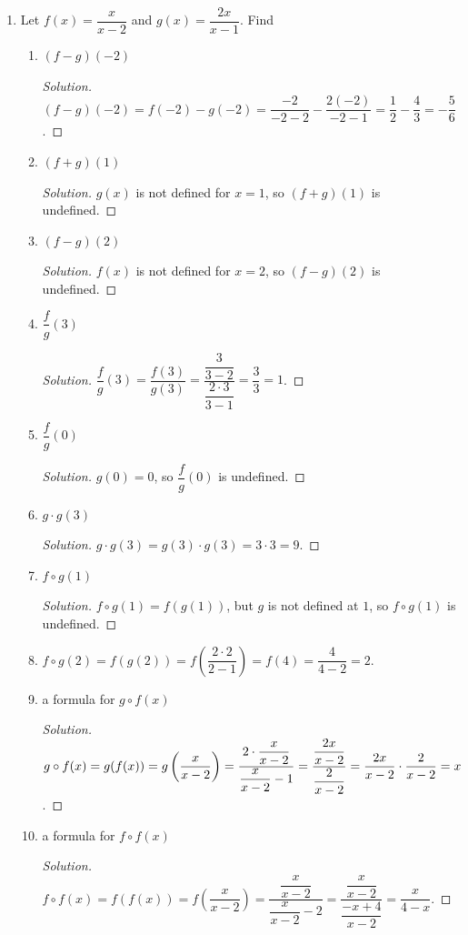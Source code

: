 \documentclass[12pt]{article}
\newenvironment{solution}{\begin{proof}[Solution]}{\end{proof}}
\begin{document}
	\begin{enumerate}
		\item Let $f(x)=\dfrac{x}{x-2}$ and $g(x)=\dfrac{2x}{x-1}$. Find
		\begin{enumerate}
			\item $(f-g)(-2)$
			\begin{solution}
				$(f-g)(-2)=f(-2)-g(-2)=\dfrac{-2}{-2-2}-\dfrac{2(-2)}{-2-1}=\dfrac{1}{2}-\dfrac{4}{3}=-\dfrac{5}{6}$.
			\end{solution}
			\item $(f+g)(1)$
			\begin{solution}
				$g(x)$ is not defined for $x=1$, so $(f+g)(1)$ is undefined.
			\end{solution}
			\item $(f-g)(2)$
			\begin{solution}
				$f(x)$ is not defined for $x=2$, so $(f-g)(2)$ is undefined.
			\end{solution}
			\item $\dfrac{f}{g}(3)$
			\begin{solution}
				$\dfrac{f}{g}(3)=\dfrac{f(3)}{g(3)}=\dfrac{\dfrac{3}{3-2}}{\dfrac{2\cdot 3}{3-1}}=\dfrac{3}{3}=1$.
			\end{solution}
			\item $\dfrac{f}{g}(0)$
			\begin{solution}
				$g(0)=0$, so $\dfrac{f}{g}(0)$ is undefined.
			\end{solution}
			\item $g\cdot g(3)$
			\begin{solution}
				$g\cdot g(3)=g(3)\cdot g(3)=3\cdot 3=9.$
			\end{solution}
			\item $f\circ g(1)$
			\begin{solution}
				$f\circ g(1)=f(g(1))$, but $g$ is not defined at $1$, so $f\circ g(1)$ is undefined.
			\end{solution}
			\item $f\circ g(2)=f(g(2))=f\left(\dfrac{2\cdot 2}{2-1}\right)=f(4)=\dfrac{4}{4-2}=2$.
			\item a formula for $g \circ f(x)$
			\begin{solution}
				$g\circ f(x)=g(f(x))=g\left(\dfrac{x}{x-2}\right)=\dfrac{2\cdot\dfrac{x}{x-2}}{\dfrac{x}{x-2}-1}=\dfrac{\dfrac{2x}{x-2}}{\dfrac{2}{x-2}}\\=\dfrac{2x}{x-2}\cdot \dfrac{2}{x-2}=x$.
			\end{solution}
			\item a formula for $f \circ f (x)$
			\begin{solution}
				$f\circ f(x)=f(f(x))=f\left(\dfrac{x}{x-2}\right)=\dfrac{\dfrac{x}{x-2}}{\dfrac{x}{x-2}-2}=\dfrac{\dfrac{x}{x-2}}{\dfrac{-x+4}{x-2}}=\dfrac{x}{4-x}$.
			\end{solution}
		\end{enumerate}
		

\end{enumerate}
\end{document}

